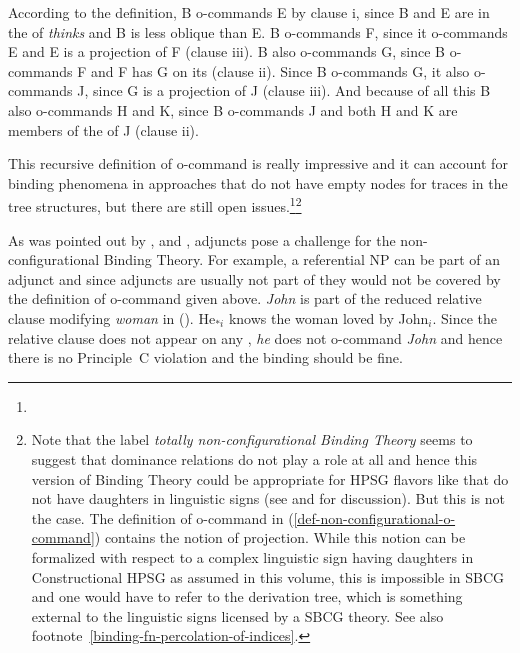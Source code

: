 \documentclass[output=paper
 	        ,biblatex
                ,babelshorthands
                ,newtxmath
                ,draftmode
                ,colorlinks, citecolor=brown
]{langscibook}
\begin{document}
According to the definition, B o-commands E by clause i, since B and E are in the \argstl of
\emph{thinks} and B is less oblique than E. B o-commands F, since it o-commands E and E
is a projection of F (clause iii). B also o-commands G, since B o-commands F and F has G on its
\argstl (clause ii). Since B o-commands G, it also o-commands J, since G is a projection of J
(clause iii). And because of all this B also o-commands H and K, since B o-commands J and both H and
K are members of the \argstl of J (clause ii). 

This recursive definition of o-command is really impressive and it can account for binding phenomena
in approaches that do not have empty nodes for traces in the tree structures, but there are still open
issues.\footnote{
}\footnote{%
Note that the label \emph{totally non-configurational Binding Theory} seems to suggest that
dominance relations do not play a role at all and hence this version of Binding Theory could be appropriate for
HPSG flavors like \sbcg that do not have daughters in linguistic signs (see  and
 for discussion). But this is not the case. The definition of o-command in
(\ref{def-non-configurational-o-command}) contains the notion of projection. While this notion can
be formalized with respect to a complex linguistic sign having daughters in Constructional HPSG as
assumed in this volume, this is impossible in SBCG and one would have to refer to the derivation
tree, which is something external to the linguistic signs licensed by a SBCG theory. See also footnote~\ref{binding-fn-percolation-of-indices}.%
}

As was pointed out by \citet[]{HL96a}, \citet[Sect~20.4.1]{Mueller99a} and \citet{Walker2011a}, adjuncts pose a challenge for the
non-configurational Binding Theory. For example, a referential NP can be part of an adjunct and
since adjuncts are usually not part of \argstls they would not be covered by the definition of
o-command given above. \emph{John} is part of the reduced relative clause modifying \emph{woman} in
().
\ea
\label{ex-he-knows-the-woman-loved-by-John}
He$_{*i}$ knows the woman loved by John$_i$.
\z
Since the relative clause does not appear on any \argstl, \emph{he} does not o-command \emph{John}
and hence there is no Principle~C violation and the binding should be fine.
\end{document}
